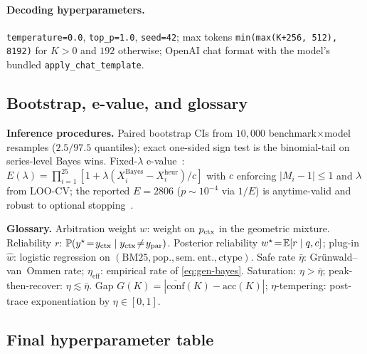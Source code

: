 \paragraph{Decoding hyperparameters.}
\texttt{temperature=0.0}, \texttt{top\_p=1.0}, \texttt{seed=42}; max
tokens \texttt{min(max(K{+}256,\,512),\,8192)} for $K\!>\!0$ and
$192$ otherwise; OpenAI chat format with the model's bundled
\texttt{apply\_chat\_template}.


\subsection{Bootstrap, e-value, and glossary}
\label{app:bootstrap-evalue}

\textbf{Inference procedures.}  Paired bootstrap CIs from $10{,}000$
benchmark$\times$model resamples ($2.5/97.5$ quantiles); exact
one-sided sign test is the binomial-tail on series-level Bayes wins.
Fixed-$\lambda$ e-value~\citep{shafer2021testing}:
$E(\lambda)=\prod_{i=1}^{25}[1+\lambda(X_i^{\mathrm{Bayes}}-X_i^{\mathrm{heur}})/c]$
with $c$ enforcing $|M_i-1|\!\le\!1$ and $\lambda$ from LOO-CV; the
reported $E\!=\!2806$ ($p\!\sim\!10^{-4}$ via $1/E$) is anytime-valid
and robust to optional stopping~\citep{ramdas2023game}.

\textbf{Glossary.}  Arbitration weight $w$: weight on $p_{\mathrm{ctx}}$ in the
geometric mixture.  Reliability $r$: $\mathbb{P}(y^\star\!=\!y_{\mathrm{ctx}}\mid y_{\mathrm{ctx}}\!\neq\!y_{\mathrm{par}})$.
Posterior reliability $w^\star\!=\!\mathbb{E}[r\mid q,c]$; plug-in $\hat w$:
logistic regression on $(\mathrm{BM25},\mathrm{pop.},\mathrm{sem.\ ent.},\mathrm{ctype})$.
Safe rate $\bar\eta$: Gr\"unwald--van~Ommen rate; $\eta_{\mathrm{eff}}$:
empirical rate of \eqref{eq:gen-bayes}.  Saturation: $\eta\!>\!\bar\eta$;
peak-then-recover: $\eta\!\lesssim\!\bar\eta$.
Gap $G(K)\!=\!|\overline{\mathrm{conf}}(K)\!-\!\mathrm{acc}(K)|$;
$\eta$-tempering: post-trace exponentiation by $\eta\!\in\![0,1]$.


\subsection{Final hyperparameter table}
\label{app:final-hyperparam}

